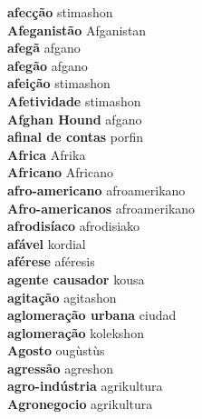 \textbf{ afecção  } stimashon \\
\textbf{ Afeganistão  } Afganistan \\
\textbf{ afegã  } afgano \\
\textbf{ afegão  } afgano \\
\textbf{ afeição  } stimashon \\
\textbf{ Afetividade  } stimashon \\
\textbf{ Afghan Hound  } afgano \\
\textbf{ afinal de contas  } porfin \\
\textbf{ Africa  } Afrika \\
\textbf{ Africano  } Africano \\
\textbf{ afro-americano  } afroamerikano \\
\textbf{ Afro-americanos  } afroamerikano \\
\textbf{ afrodisíaco  } afrodisiako \\
\textbf{ afável  } kordial \\
\textbf{ aférese  } aféresis \\
\textbf{ agente causador  } kousa \\
\textbf{ agitação  } agitashon \\
\textbf{ aglomeração urbana  } ciudad \\
\textbf{ aglomeração  } kolekshon \\
\textbf{ Agosto  } ougùstùs \\
\textbf{ agressão  } agreshon \\
\textbf{ agro-indústria  } agrikultura \\
\textbf{ Agronegocio  } agrikultura \\
